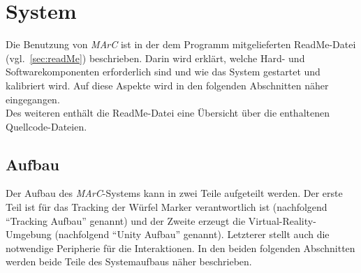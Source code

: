 
\section{System}
Die Benutzung von \textit{MArC} ist in der dem Programm mitgelieferten ReadMe-Datei (vgl.~\ref{sec:readMe}) beschrieben. Darin wird erklärt, welche Hard- und Softwarekomponenten erforderlich sind und wie das System gestartet und kalibriert wird. Auf diese Aspekte wird in den folgenden Abschnitten näher eingegangen.\\ 
Des weiteren enthält die ReadMe-Datei eine Übersicht über die enthaltenen Quellcode-Dateien.
\subsection{Aufbau}\label{sec:Aufbau}
Der Aufbau des \textit{MArC}-Systems kann in zwei Teile aufgeteilt werden. Der erste Teil ist für das Tracking der Würfel Marker verantwortlich ist (nachfolgend "`Tracking Aufbau"' genannt) und der Zweite erzeugt die Virtual-Reality-Umgebung (nachfolgend "`Unity Aufbau"' genannt). Letzterer stellt auch die notwendige Peripherie für die Interaktionen. In den beiden folgenden Abschnitten werden beide Teile des Systemaufbaus näher beschrieben.

